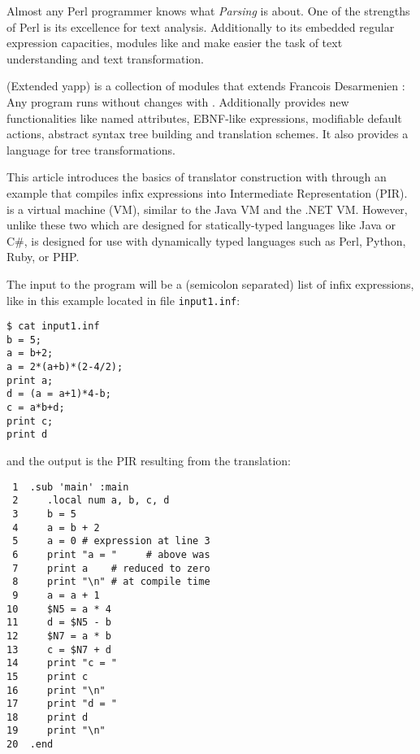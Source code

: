 Almost any Perl programmer knows what {\it Parsing} is about.
One of the strengths of Perl is its excellence for text analysis. 
Additionally to its embedded regular expression capacities, modules 
like  \cite{conwayrd} and 
 \cite{desarmenien} make easier the task of text 
understanding and text transformation.

 (Extended yapp) is a collection of modules
that extends Francois Desarmenien  :
Any  program runs without changes with .
Additionally  provides new 
functionalities like named attributes,
EBNF-like expressions, modifiable default actions,
abstract syntax tree building and translation schemes. 
It also provides a language for tree transformations.

This article introduces the basics of 
translator construction with  through an
example that compiles infix expressions into  
Intermediate Representation (PIR)\cite{randal04}.
 is a virtual machine (VM), similar to the Java VM and the
.NET VM. However, unlike these two which are designed for
statically-typed languages like Java or C\#,  is designed for
use with dynamically typed languages such as Perl, Python, Ruby,
or PHP.

The input to the program will be a (semicolon separated)
list of infix expressions, like in this example 
located in file \verb|input1.inf|:
\begin{verbatim}
$ cat input1.inf 
b = 5;
a = b+2;
a = 2*(a+b)*(2-4/2);
print a;
d = (a = a+1)*4-b;
c = a*b+d;
print c;
print d
\end{verbatim}

and the output is the
PIR resulting from the translation: 
\begin{verbatim}
 1  .sub 'main' :main
 2     .local num a, b, c, d
 3     b = 5
 4     a = b + 2
 5     a = 0 # expression at line 3 
 6     print "a = "     # above was
 7     print a    # reduced to zero
 8     print "\n" # at compile time
 9     a = a + 1
10     $N5 = a * 4
11     d = $N5 - b
12     $N7 = a * b
13     c = $N7 + d
14     print "c = "
15     print c
16     print "\n"
17     print "d = "
18     print d
19     print "\n"
20  .end
\end{verbatim}

